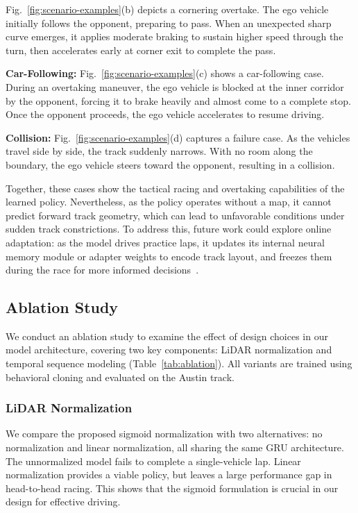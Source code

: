 \documentclass[letterpaper,10 pt,conference]{ieeeconf}
\begin{document}
Fig.~\ref{fig:scenario-examples}(b) depicts a cornering overtake. The ego vehicle initially follows the opponent, preparing to pass. When an unexpected sharp curve emerges, it applies moderate braking to sustain higher speed through the turn, then accelerates early at corner exit to complete the pass.

\textbf{Car-Following:} Fig.~\ref{fig:scenario-examples}(c) shows a car-following case. During an overtaking maneuver, the ego vehicle is blocked at the inner corridor by the opponent, forcing it to brake heavily and almost come to a complete stop. Once the opponent proceeds, the ego vehicle accelerates to resume driving.

\textbf{Collision:} Fig.~\ref{fig:scenario-examples}(d) captures a failure case. As the vehicles travel side by side, the track suddenly narrows. With no room along the boundary, the ego vehicle steers toward the opponent, resulting in a collision.

Together, these cases show the tactical racing and overtaking capabilities of the learned policy. Nevertheless, as the policy operates without a map, it cannot predict forward track geometry, which can lead to unfavorable conditions under sudden track constrictions. To address this, future work could explore online adaptation: as the model drives practice laps, it updates its internal neural memory module or adapter weights to encode track layout, and freezes them during the race for more informed decisions~\cite{wijmans2023emergence}.

\subsection{Ablation Study}
\label{sec:ablation}

We conduct an ablation study to examine the effect of design choices in our model architecture, covering two key components: LiDAR normalization and temporal sequence modeling (Table~\ref{tab:ablation}). All variants are trained using behavioral cloning and evaluated on the Austin track.

\subsubsection{LiDAR Normalization}

We compare the proposed sigmoid normalization with two alternatives: no normalization and linear normalization, all sharing the same GRU architecture. The unnormalized model fails to complete a single-vehicle lap. Linear normalization provides a viable policy, but leaves a large performance gap in head-to-head racing. This shows that the sigmoid formulation is crucial in our design for effective driving.
\end{document}
